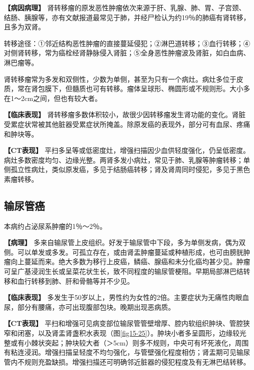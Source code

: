 \textbf{【病因病理】}
肾转移瘤的原发恶性肿瘤依次来源于肝、乳腺、肺、胃、子宫颈、结肠、胰腺等，亦有文献报道最常见于肺，并经尸检认为约19％的肺癌有肾转移，且多为双肾。

转移途径：①邻近结构恶性肿瘤的直接蔓延侵犯；②淋巴道转移；③血行转移；④对侧肾转移，常为癌栓经肾静脉侵入肾脏；⑤全身恶性肿瘤波及肾脏，如白血病、淋巴瘤等。

肾转移瘤常为多发和双侧性，少数为单侧，甚至为只有一个病灶。病灶多位于皮质，常在肾包膜下，但髓质也可有转移。瘤体呈球形、椭圆形或不规则形。大小多在1～2cm之间，但也有较大者。

\textbf{【临床表现】}
肾转移瘤多数体积较小，故很少因转移瘤发生肾功能的变化。肾脏受累症状常被其他脏器受累症状所掩盖。除原发癌的表现外，部分可有血尿、疼痛和肿块等。

\textbf{【CT表现】}
平扫多呈等或低密度灶，增强扫描因少血供轻度强化，仍呈低密度。病灶多数密度均匀、边缘光整。两肾多发小病灶，常见于肺、乳腺等肿瘤转移；单侧孤立性病灶，类似原发癌，多见于结肠癌转移；肾及肾周同时侵犯，多见于黑色素瘤转移。

\subsection{输尿管癌}

本病约占泌尿系肿瘤的1％～2％。

\textbf{【病理】}
多来自输尿管上皮组织。好发于输尿管中下段，多为单侧发病，偶为双侧。可以单发或多发。可孤立存在，或由肾盂肿瘤蔓延或种植形成，也可由膀胱肿瘤向上蔓延而来。绝大多数为移行上皮癌，鳞癌、腺癌和未分化癌均甚少见。肿瘤可呈广基浸润生长或呈菜花状生长，致不同程度的输尿管梗阻。早期局部淋巴结转移和血行转移到肺、肝和骨骼等并不少见。

\textbf{【临床表现】}
多发生于50岁以上，男性约为女性的2倍。主要症状为无痛性肉眼血尿，部分有腰痛，亦可出现腹部包块。晚期出现恶病质。

\textbf{【CT表现】}
平扫和增强可见病变部位输尿管管壁增厚、腔内软组织肿块、管腔狭窄和闭塞，以及肾盂肾盏积水表现（图\ref{fig15-25}）。肿块小者多呈圆形，边缘较光整或有小棘状突起；肿块较大者（＞5cm）则多不规则，中央可有坏死液化，周围有粘连浸润。增强扫描呈轻度不均匀强化，与管壁强化程度相仿；肾盂期可见输尿管内不规则充盈缺损。增强扫描还可明确邻近脏器的侵犯程度及有无淋巴结转移。

